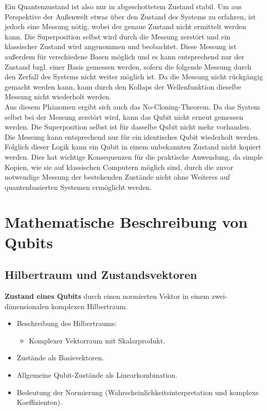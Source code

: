 Ein Quantenzustand ist also nur in abgeschottetem Zustand stabil. Um aus Perspektive der Außenwelt etwas über den Zustand des Systems zu erfahren, ist jedoch eine Messung nötig, wobei der genaue Zustand nicht ermittelt werden kann.
Die Superposition selbst wird durch die Messung zerstört und ein klassischer Zustand wird angenommen und beobachtet. Diese Messung ist außerdem für verschiedene Basen möglich und es kann entsprechend nur der Zustand bzgl. einer Basis gemessen werden, sofern die folgende Messung durch den Zerfall des Systems nicht weiter möglich ist.
Da die Messung nicht rückgängig gemacht werden kann, kann durch den Kollaps der Wellenfunktion dieselbe Messung nicht wiederholt werden.
\cite{homeister_quantum_2022}
\\

Aus diesem Phänomen ergibt sich auch das No-Cloning-Theorem. Da das System selbst bei der Messung zerstört wird, kann das Qubit nicht erneut gemessen werden. Die Superposition selbst ist für dasselbe Qubit nicht mehr vorhanden. Die Messung kann entsprechend nur für ein identisches Qubit wiederholt werden.
Folglich dieser Logik kann ein Qubit in einem unbekannten Zustand nicht kopiert werden. Dies hat wichtige Konsequenzen für die praktische Anwendung, da simple Kopien, wie sie auf klassischen Computern möglich sind, durch die zuvor notwendige Messung der bestehenden Zustände nicht ohne Weiteres auf quantenbasierten Systemen ermöglicht werden.
\cite{hughes_quantum_2021}

\section{Mathematische Beschreibung von Qubits}

\subsection{Hilbertraum und Zustandsvektoren}
\textbf{Zustand eines Qubits} durch einen normierten Vektor in einem zwei-dimensionalen komplexen Hilbertraum.
\begin{itemize}
    \item Beschreibung des Hilbertraums:
    \begin{itemize}
        \item Komplexer Vektorraum mit Skalarprodukt.
    \end{itemize}
    \item Zustände als Basisvektoren.
    \item Allgemeine Qubit-Zustände als Linearkombination.
    \item Bedeutung der Normierung (Wahrscheinlichkeitsinterpretation und komplexe Koeffizienten).
\end{itemize}

